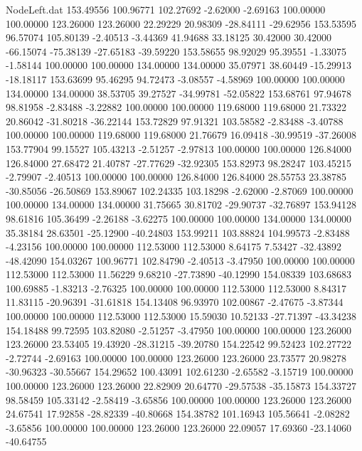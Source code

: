 \begin{filecontents}{NodeLeft.dat}
 153.49556  100.96771  102.27692    -2.62000   -2.69163  100.00000  100.00000  123.26000  123.26000   22.29229   20.98309  -28.84111  -29.62956
 153.53595   96.57074  105.80139    -2.40513   -3.44369   41.94688   33.18125   30.42000   30.42000  -66.15074  -75.38139  -27.65183  -39.59220
 153.58655   98.92029   95.39551    -1.33075   -1.58144  100.00000  100.00000  134.00000  134.00000   35.07971   38.60449  -15.29913  -18.18117
 153.63699   95.46295   94.72473    -3.08557   -4.58969  100.00000  100.00000  134.00000  134.00000   38.53705   39.27527  -34.99781  -52.05822
 153.68761   97.94678   98.81958    -2.83488   -3.22882  100.00000  100.00000  119.68000  119.68000   21.73322   20.86042  -31.80218  -36.22144
 153.72829   97.91321  103.58582    -2.83488   -3.40788  100.00000  100.00000  119.68000  119.68000   21.76679   16.09418  -30.99519  -37.26008
 153.77904   99.15527  105.43213    -2.51257   -2.97813  100.00000  100.00000  126.84000  126.84000   27.68472   21.40787  -27.77629  -32.92305
 153.82973   98.28247  103.45215    -2.79907   -2.40513  100.00000  100.00000  126.84000  126.84000   28.55753   23.38785  -30.85056  -26.50869
 153.89067  102.24335  103.18298    -2.62000   -2.87069  100.00000  100.00000  134.00000  134.00000   31.75665   30.81702  -29.90737  -32.76897
 153.94128   98.61816  105.36499    -2.26188   -3.62275  100.00000  100.00000  134.00000  134.00000   35.38184   28.63501  -25.12900  -40.24803
 153.99211  103.88824  104.99573    -2.83488   -4.23156  100.00000  100.00000  112.53000  112.53000    8.64175    7.53427  -32.43892  -48.42090
 154.03267  100.96771  102.84790    -2.40513   -3.47950  100.00000  100.00000  112.53000  112.53000   11.56229    9.68210  -27.73890  -40.12990
 154.08339  103.68683  100.69885    -1.83213   -2.76325  100.00000  100.00000  112.53000  112.53000    8.84317   11.83115  -20.96391  -31.61818
 154.13408   96.93970  102.00867    -2.47675   -3.87344  100.00000  100.00000  112.53000  112.53000   15.59030   10.52133  -27.71397  -43.34238
 154.18488   99.72595  103.82080    -2.51257   -3.47950  100.00000  100.00000  123.26000  123.26000   23.53405   19.43920  -28.31215  -39.20780
 154.22542   99.52423  102.27722    -2.72744   -2.69163  100.00000  100.00000  123.26000  123.26000   23.73577   20.98278  -30.96323  -30.55667
 154.29652  100.43091  102.61230    -2.65582   -3.15719  100.00000  100.00000  123.26000  123.26000   22.82909   20.64770  -29.57538  -35.15873
 154.33727   98.58459  105.33142    -2.58419   -3.65856  100.00000  100.00000  123.26000  123.26000   24.67541   17.92858  -28.82339  -40.80668
 154.38782  101.16943  105.56641    -2.08282   -3.65856  100.00000  100.00000  123.26000  123.26000   22.09057   17.69360  -23.14060  -40.64755

\end{filecontents}

